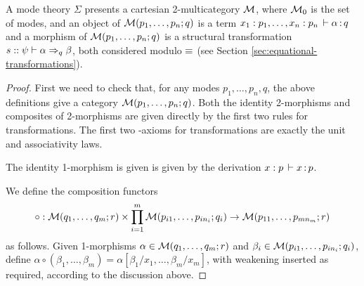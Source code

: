 \begin{theorem}
\label{thm:completeness-mode-theory}
A mode theory $\Sigma$ presents a cartesian 2-multicategory $\mathcal{M}$, where
$\mathcal{M}_0$ is the set of modes, and an object of $\mathcal{M}(p_1,\ldots,p_n;q)$ is a
term $x_1:p_1,\ldots,x_n:p_n \, \vdash \alpha \, \mathit{:} \, q$ and a morphism of $\mathcal{M}(p_1,\ldots,p_n;q)$ is a structural transformation
$s :: \psi \vdash \alpha \Rightarrow_{q} \beta$, both considered modulo $\equiv$ (see Section \ref{sec:equational-transformations}).
\end{theorem}
\begin{proof}
First we need to check that, for any modes $p_1, \dots, p_n, q$, the above definitions give a category $\mathcal{M}(p_1,\ldots,p_n;q)$. Both the identity 2-morphisms and composites of 2-morphisms are given directly by the first two rules for transformations. The first two \deq-axioms for transformations are exactly the unit and associativity laws.

The identity 1-morphism is given is given by the derivation $x : p \, \vdash x \, \mathit{:} \, p$.

We define the composition functors
\[ \circ : \mathcal{M}(q_1, \dots, q_m; r) \times \prod_{i=1}^m \mathcal{M}(p_{i1},\dots,p_{in_i};q_i) \rightarrow \mathcal{M}(p_{11},\dots,p_{mn_m};r) \]
as follows. Given 1-morphisms $\alpha \in \mathcal{M}(q_1, \dots, q_m; r)$ and $\beta_i \in \mathcal{M}(p_{i1},\dots,p_{in_i};q_i)$, define $\alpha \circ (\beta_1, \dots, \beta_m) = \alpha[\beta_1/x_1, \dots, \beta_m / x_m]$, with weakening inserted as required, according to the discussion above.


\end{proof}
